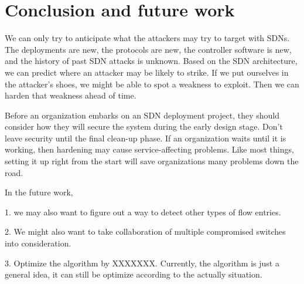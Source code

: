 \chapter{Conclusion and future work}
\label{conclusion}

We can only try to anticipate what the attackers may try to target with SDNs.  The deployments are new, the protocols are new, the controller software is new, and the history of past SDN attacks is unknown.  Based on the SDN architecture, we can predict where an attacker may be likely to strike.  If we put ourselves in the attacker’s shoes, we might be able to spot a weakness to exploit. Then we can harden that weakness ahead of time.

Before an organization embarks on an SDN deployment project, they should consider how they will secure the system during the early design stage.  Don’t leave security until the final clean-up phase.  If an organization waits until it is working, then hardening  may cause service-affecting problems.  Like most things, setting it up right from the start will save organizations many problems down the road.

In the future work, 

1. we may also want to figure out a way to detect other types of flow entries.

2. We might also want to take collaboration of multiple compromised switches into consideration.

3. Optimize the algorithm by XXXXXXX. Currently, the algorithm is just a general idea, it can still be optimize according to the actually situation.
